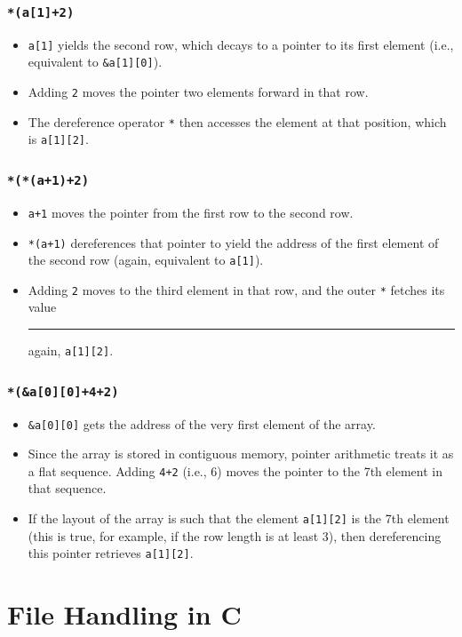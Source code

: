 \documentclass[a4paper, 10pt]{article}
\begin{document}
\subsubsection*{\texttt{*(a[1]+2)}}
\begin{itemize}
    \item \texttt{a[1]} yields the second row, which decays to a pointer to its first element (i.e., equivalent to \texttt{\&a[1][0]}).
    \item Adding \texttt{2} moves the pointer two elements forward in that row.
    \item The dereference operator \texttt{*} then accesses the element at that position, which is \texttt{a[1][2]}.
\end{itemize}

\subsubsection*{\texttt{*(*(a+1)+2)}}
\begin{itemize}
    \item \texttt{a+1} moves the pointer from the first row to the second row.
    \item \texttt{*(a+1)} dereferences that pointer to yield the address of the first element of the second row (again, equivalent to \texttt{a[1]}).
    \item Adding \texttt{2} moves to the third element in that row, and the outer \texttt{*} fetches its value \rule{\textwidth}{0.5pt}again, \texttt{a[1][2]}.
\end{itemize}

\subsubsection*{\texttt{*(\&a[0][0]+4+2)}}
\begin{itemize}
    \item \texttt{\&a[0][0]} gets the address of the very first element of the array.
    \item Since the array is stored in contiguous memory, pointer arithmetic treats it as a flat sequence. Adding \texttt{4+2} (i.e., 6) moves the pointer to the 7th element in that sequence.
    \item If the layout of the array is such that the element \texttt{a[1][2]} is the 7th element (this is true, for example, if the row length is at least 3), then dereferencing this pointer retrieves \texttt{a[1][2]}.
\end{itemize}
\section{File Handling in C}
\end{document}
